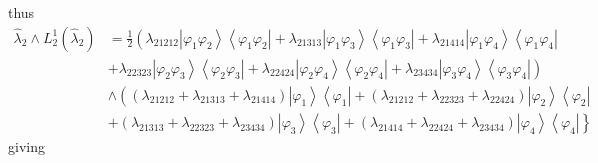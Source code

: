 \documentclass[aps,preprint]{revtex4}%
\begin{document}
thus%
\begin{align*}
\hat{\lambda}_{2}\wedge L_{2}^{1}\left(  \hat{\lambda}_{2}\right)   &
=\frac{1}{2}\left(  \lambda_{21212}\left\vert \varphi_{1}\varphi
_{2}\right\rangle \left\langle \varphi_{1}\varphi_{2}\right\vert
+\lambda_{21313}\left\vert \varphi_{1}\varphi_{3}\right\rangle \left\langle
\varphi_{1}\varphi_{3}\right\vert +\lambda_{21414}\left\vert \varphi
_{1}\varphi_{4}\right\rangle \left\langle \varphi_{1}\varphi_{4}\right\vert
\right. \\
&  +\left.  \lambda_{22323}\left\vert \varphi_{2}\varphi_{3}\right\rangle
\left\langle \varphi_{2}\varphi_{3}\right\vert +\lambda_{22424}\left\vert
\varphi_{2}\varphi_{4}\right\rangle \left\langle \varphi_{2}\varphi
_{4}\right\vert +\lambda_{23434}\left\vert \varphi_{3}\varphi_{4}\right\rangle
\left\langle \varphi_{3}\varphi_{4}\right\vert \right) \\
&  \wedge\left(  \left(  \lambda_{21212}+\lambda_{21313}+\lambda
_{21414}\right)  \left\vert \varphi_{1}\right\rangle \left\langle \varphi
_{1}\right\vert +\left(  \lambda_{21212}+\lambda_{22323}+\lambda
_{22424}\right)  \left\vert \varphi_{2}\right\rangle \left\langle \varphi
_{2}\right\vert \right. \\
&  +\left.  \left(  \lambda_{21313}+\lambda_{22323}+\lambda_{23434}\right)
\left\vert \varphi_{3}\right\rangle \left\langle \varphi_{3}\right\vert
+\left(  \lambda_{21414}+\lambda_{22424}+\lambda_{23434}\right)  \left\vert
\varphi_{4}\right\rangle \left\langle \varphi_{4}\right\vert \right\}
\end{align*}
giving
\end{document}
